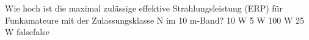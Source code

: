    {Wie hoch ist die maximal zulässige effektive Strahlungsleistung (ERP) für Funkamateure mit der Zulassungsklasse N im 10 m-Band?}
    {10 W}
    {5 W}
    {100 W}
    {25 W}
    {false}{false}